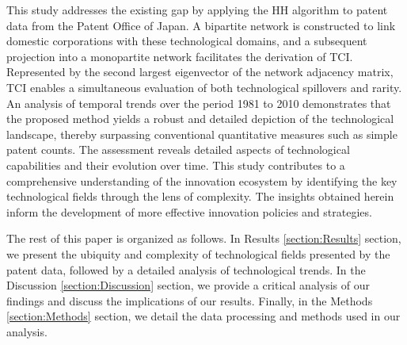 This study addresses the existing gap by applying the HH algorithm to patent data from the Patent Office of Japan.
A bipartite network is constructed to link domestic corporations with these technological domains, and a subsequent projection into a monopartite network facilitates the derivation of TCI.
Represented by the second largest eigenvector of the network adjacency matrix, TCI enables a simultaneous evaluation of both technological spillovers and rarity.
An analysis of temporal trends over the period 1981 to 2010 demonstrates that the proposed method yields a robust and detailed depiction of the technological landscape, thereby surpassing conventional quantitative measures such as simple patent counts.
The assessment reveals detailed aspects of technological capabilities and their evolution over time.
This study contributes to a comprehensive understanding of the innovation ecosystem by identifying the key technological fields through the lens of complexity.
The insights obtained herein inform the development of more effective innovation policies and strategies.

The rest of this paper is organized as follows. 
In Results \ref{section:Results} section, we present the ubiquity and complexity of technological fields presented by the patent data, followed by a detailed analysis of technological trends.
In the Discussion \ref{section:Discussion} section, we provide a critical analysis of our findings and discuss the implications of our results.
Finally, in the Methods \ref{section:Methods} section, we detail the data processing and methods used in our analysis.
